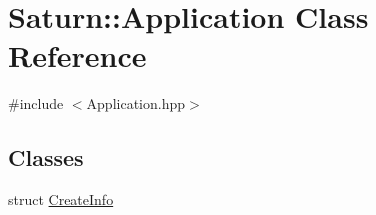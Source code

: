 \hypertarget{class_saturn_1_1_application}{}\section{Saturn\+:\+:Application Class Reference}
\label{class_saturn_1_1_application}


{\ttfamily \#include $<$Application.\+hpp$>$}

\subsection*{Classes}
\begin{DoxyCompactItemize}
\item 
struct \mbox{\hyperlink{struct_saturn_1_1_application_1_1_create_info}{Create\+Info}}
\end{DoxyCompactItemize}
